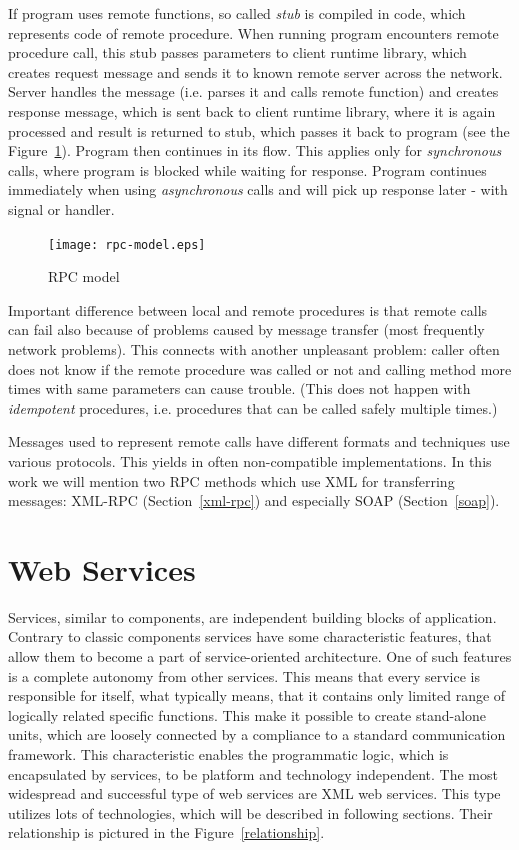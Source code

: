 \documentclass[12pt,notitlepage]{report}
\begin{document}
If program uses remote functions, so called  \textit{stub} is compiled in code, which represents code of remote procedure. When running program encounters remote procedure call, this stub passes parameters to client runtime library, which creates request message and sends it to known remote server across the network. Server handles the message (i.e. parses it and calls remote function) and creates response message, which is sent back to client runtime library, where it is again processed and result is returned to stub, which passes it back to program (see the Figure~\ref{rpc-model}). Program then continues in its flow. This applies only for \textit{synchronous} calls, where program is blocked while waiting for response. Program continues immediately when using \textit{asynchronous} calls and will pick up response later - with signal or handler.

\begin{figure}[htb]
 \begin{center}
  \texttt{[image: rpc-model.eps]}
 \end{center}
 \caption{RPC model}
 \label{rpc-model}
\end{figure}

Important difference between local and remote procedures is that remote calls can fail also because of problems caused by message transfer (most frequently network problems). This connects with another unpleasant problem: caller often does not know if the remote procedure was called or not and calling method more times with same parameters can cause trouble. (This does not happen with \textit{idempotent} procedures, i.e. procedures that can be called safely multiple times.)

Messages used to represent remote calls have different formats and techniques use various protocols. This yields in often non-compatible implementations. In this work we will mention two RPC methods which use XML for transferring messages: XML-RPC (Section~\ref{xml-rpc}) and especially SOAP (Section~\ref{soap}).

\section{Web Services}
Services, similar to components, are independent building blocks of application. Contrary to classic components services have some characteristic features, that allow them to become a part of service-oriented architecture. One of such features is a complete autonomy from other services. This means that every service is responsible for itself, what typically means, that it contains only limited range of logically related specific functions. This make it possible to create stand-alone units, which are loosely connected by a compliance to a standard communication framework. This characteristic enables the programmatic logic, which is encapsulated by services, to be platform and technology independent. The most widespread and successful type of web services are XML web services. This type utilizes lots of technologies, which will be described in following sections. Their relationship is pictured in the Figure~\ref{relationship}.
\end{document}
